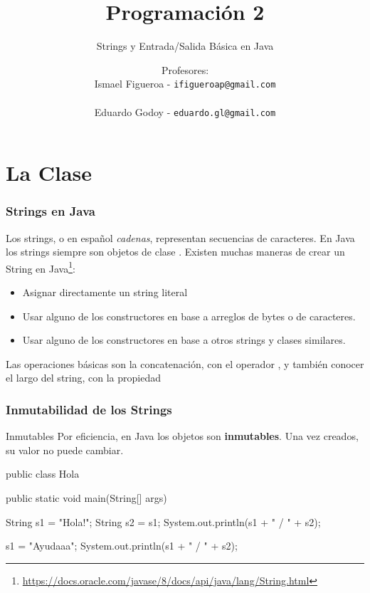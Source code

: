 \documentclass{beamer}
\title[\textbf{Programación 2}]{\textbf{Programación 2}}
\subtitle{Strings y Entrada/Salida Básica en Java}
\author[IF-EG]
{Profesores:\\
  Ismael Figueroa -  \texttt{\small ifigueroap@gmail.com} \\
  \vspace{0.5mm} \\
  Eduardo Godoy - \texttt{\small eduardo.gl@gmail.com}
}
\institute[Universidad de Valparaíso]
\date{}
\begin{document}
\begin{frame}
  \titlepage
\end{frame}

\section{La Clase }

\begin{frame}
  \frametitle{Strings en Java}

  Los strings, o en español \emph{cadenas}, representan secuencias de
  caracteres. En Java los strings siempre son objetos de clase
  . Existen muchas maneras de crear un String en
  Java\footnote{\url{https://docs.oracle.com/javase/8/docs/api/java/lang/String.html}}:

  \begin{itemize}    
  \item Asignar directamente un string literal
  \item Usar alguno de los constructores en base a arreglos de bytes o
    de caracteres.    
  \item Usar alguno de los constructores en base a otros strings y
    clases similares.
  \end{itemize}

  Las operaciones básicas son la concatenación, con el operador
  \codet{+}, y también conocer el largo del string, con la propiedad
  
\end{frame}

\begin{frame}[fragile]
  \frametitle{Inmutabilidad de los Strings}

  \begin{alertblock}{Inmutables}
    Por eficiencia, en Java los objetos  son
    \textbf{inmutables}. Una vez creados, su valor no puede cambiar.
  \end{alertblock}

  \begin{jsmall}
    public class Hola {
      public static void main(String[] args) {
        String s1 = "Hola!";
        String s2 = s1;
        System.out.println(s1 + " / " + s2);
        
        s1 = "Ayudaaa";
        System.out.println(s1 + " / " + s2);
      }
    }    
  \end{jsmall}
  
\end{frame}
\end{document}

